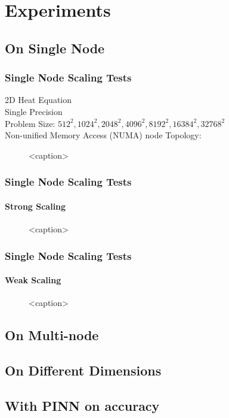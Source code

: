 
\section{Experiments}
\subsection{On Single Node}
\begin{frame}
  \frametitle{Single Node Scaling Tests}
  2D Heat Equation\\
  Single Precision \\
  Problem Size: $512^2, 1024^2, 2048^2, 4096^2, 8192^2, 16384^2, 32768^2$ \\
  Non-unified Memory Access (NUMA) node Topology:
  \begin{figure}[htbp]
    \centering
    
    \caption{<caption>}
    \label{<label>}
  \end{figure}



\end{frame}


\begin{frame}
  \frametitle{Single Node Scaling Tests}
  \framesubtitle{Strong Scaling}

  \begin{figure}[htbp]
    \centering
    
    \caption{<caption>}
    \label{<label>}
  \end{figure}

\end{frame}


\begin{frame}
  \frametitle{Single Node Scaling Tests}
  \framesubtitle{Weak Scaling}

  \begin{figure}[htbp]
    \centering
    
    \caption{<caption>}
    \label{<label>}
  \end{figure}

\end{frame}


\subsection{On Multi-node}
\begin{frame}
  \frametitle{}

  

\end{frame}

\subsection{On Different Dimensions}
\begin{frame}
  \frametitle{}

  

\end{frame}

\subsection{With PINN on accuracy}
\begin{frame}
  \frametitle{}

  

\end{frame}